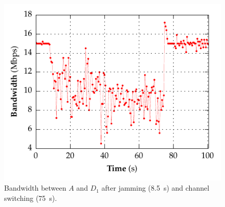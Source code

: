 \begin{figure}[t!]
  \centering
  \includegraphics[width=0.73\columnwidth]{./figures/ChannelBWGraph.pdf}
  \vspace*{-5mm}
  \caption{Bandwidth between $A$ and $D_1$ after jamming (8.5~s) and
  channel switching (75~s).}
  \label{fig:bw}
  \vspace*{-1mm}
\end{figure}
